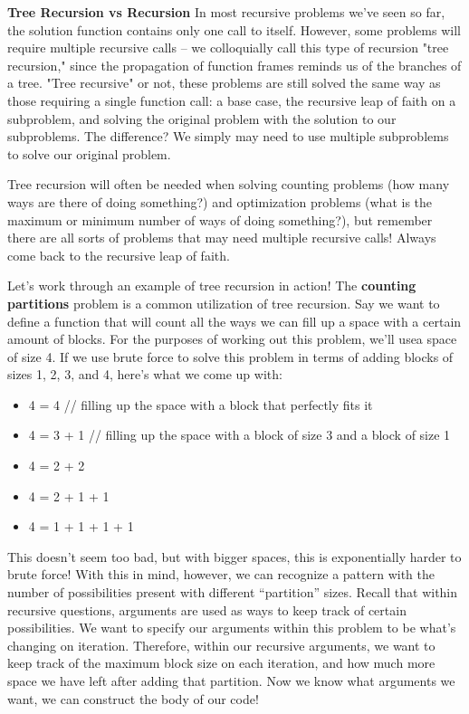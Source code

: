 \begin{blocksection}
\textbf{Tree Recursion vs Recursion}
\newline
In most recursive problems we've seen so far, the solution function contains only one call to itself. However, some problems will require multiple recursive calls -- we colloquially call this type of recursion "tree recursion," since the propagation of function frames reminds us of the branches of a tree. "Tree recursive" or not, these problems are still solved the same way as those requiring a single function call: a base case, the recursive leap of faith on a subproblem, and solving the original problem with the solution to our subproblems. The difference? We simply may need to use multiple subproblems to solve our original problem.

Tree recursion will often be needed when solving counting problems (how many ways are there of doing something?) and optimization problems (what is the maximum or minimum number of ways of doing something?), but remember there are all sorts of problems that may need multiple recursive calls! Always come back to the recursive leap of faith.

Let's work through an example of tree recursion in action! The \textbf{counting partitions} problem is a common utilization of tree recursion.
Say we want to define a function that will count all the ways we can fill up a space with a certain amount of blocks. For the purposes of working out this problem, we'll usea space of size 4. If we use brute force to solve this problem in terms of adding blocks of sizes 1, 2, 3, and 4, here's what we come up with:
\begin{itemize}
    \item 4 = 4 // filling up the space with a block that perfectly fits it
    \item 4 = 3 + 1 // filling up the space with a block of size 3 and a block of size 1
    \item 4 = 2 + 2
    \item 4 = 2 + 1 + 1
    \item 4 = 1 + 1 + 1 + 1
\end{itemize}
This doesn't seem too bad, but with bigger spaces, this is exponentially harder to brute force! With this in mind, however, we can recognize a pattern with the number of possibilities present with different ``partition'' sizes. 
\newline
\newline
Recall that within recursive questions, arguments are used as ways to keep track of certain possibilities. We want to specify our arguments within this problem to be what's changing on iteration. Therefore, within our recursive arguments, we want to keep track of the maximum block size on each iteration, and how much more space we have left after adding that partition. 
\newline
\newline
Now we know what arguments we want, we can construct the body of our code!
\end{blocksection}
